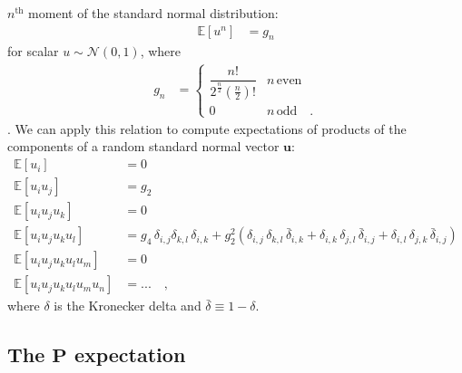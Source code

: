 \documentclass[modern]{aastex62}
\begin{document}
    $n^\mathrm{th}$ moment of the standard normal distribution:
    \begin{align}
        \mathbb{E}\left[ u^n \right] & = g_n
    \end{align}
    for scalar $u \sim \mathcal{N}(0, 1)$, where
    \begin{align}
        g_n
         & =
        \begin{cases}
            \dfrac{n!}{2^\frac{n}{2} \left(\frac{n}{2}\right)!} & n \, \mathrm{even}
            \\
            0                                                   & n \, \mathrm{odd}
            \quad.
        \end{cases}
    \end{align}
    \citep[e.g.,][]{Winkelbauer2012}.
    We can apply this relation to compute expectations
    of products of the components of a random standard normal vector $\mathbf{u}$:
    \begin{align}
        \mathbb{E}\left[u_i \right]                    & = 0
        \\[1em]
        \mathbb{E}\left[u_i u_j\right]                 & = g_2
        \\[1em]
        \mathbb{E}\left[u_i u_j u_k\right]             & = 0
        \\[1em]
        \mathbb{E}\left[u_i u_j u_k u_l\right]         & =
        g_4 \, \delta_{i, j} \delta_{k, l} \, \delta_{i, k}
        +
        g_2^2 \left(
        \delta_{i, j} \, \delta_{k, l} \, \bar{\delta}_{i, k}
        +
        \delta_{i, k} \, \delta_{j, l} \, \bar{\delta}_{i, j}
        +
        \delta_{i, l} \, \delta_{j, k} \, \bar{\delta}_{i, j}
        \right)
        \\[1em]
        \mathbb{E}\left[u_i u_j u_k u_l u_m\right]     & = 0
        \\[1em]
        \mathbb{E}\left[u_i u_j u_k u_l u_m u_n\right] & =
        ...
        \quad,
    \end{align}
    where $\delta$ is the Kronecker delta and $\bar{\delta} \equiv 1 - \delta$.

    \subsection{The $\mathbf{P}$ expectation}
\end{document}

